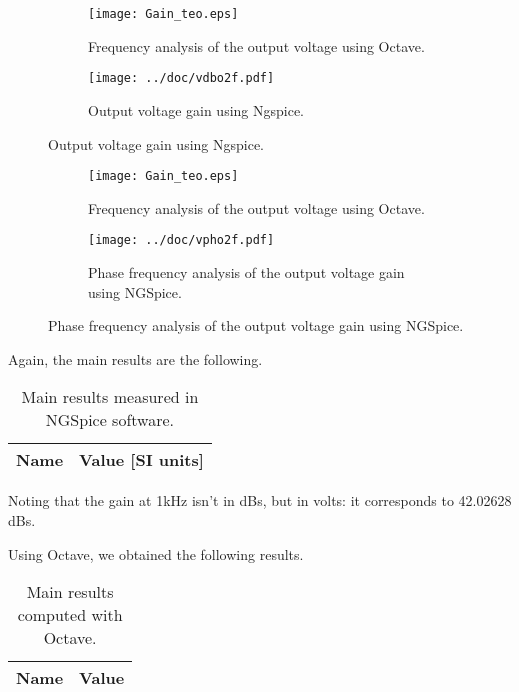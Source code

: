 \begin{figure}[!htb]
    \begin{subfigure}[b]{0.48\textwidth}
        \centering
        \texttt{[image: Gain\_teo.eps]}
        \caption{Frequency analysis of the output voltage using Octave.}
    \end{subfigure}
    \hfill
    \begin{subfigure}[b]{0.48\textwidth}
        \centering
        \texttt{[image: ../doc/vdbo2f.pdf]}
        \caption{Output voltage gain using Ngspice.}
    \end{subfigure}
\end{figure}


\begin{figure}[!htb]
    \begin{subfigure}[b]{0.48\textwidth}
        \centering
        \texttt{[image: Gain\_teo.eps]}
        \caption{Frequency analysis of the output voltage using Octave.}
    \end{subfigure}
    \hfill
    \begin{subfigure}[b]{0.48\textwidth}
        \centering
        \texttt{[image: ../doc/vpho2f.pdf]}
        \caption{Phase frequency analysis of the output voltage gain using NGSpice.}
    \end{subfigure}
    \label{compareplots}
\end{figure}

\clearpage

Again, the main results are the following.

\begin{table}[h]
    \centering
    \begin{tabular}{|l|r|}
      \hline    
      {\bf Name} & {\bf Value [SI units]} \\ \hline
      
      
      
    \end{tabular}
    \caption{Main results measured in NGSpice software.}
 \end{table}

 Noting that the gain at 1kHz isn't in dBs, but in volts: it corresponds to 42.02628 dBs.

 Using Octave, we obtained the following results.

 \begin{table}[h]
    \centering
    \begin{tabular}{|l|r|}
      \hline    
      {\bf Name} & {\bf Value} \\ \hline
      
      
      
    \end{tabular}
    \caption{Main results computed with Octave.}
    \label{tab:octave_results}
  \end{table}



